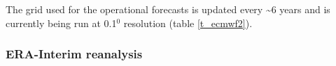 The grid used for the operational forecasts is updated every \textasciitilde{6} years and is currently being run at 0.1$^0$ resolution (table \ref{t_ecmwf2}).
%
%
%
%
%
%
%
%

\subsubsection {ERA-Interim reanalysis}  \label{ECMWF_ERA}


